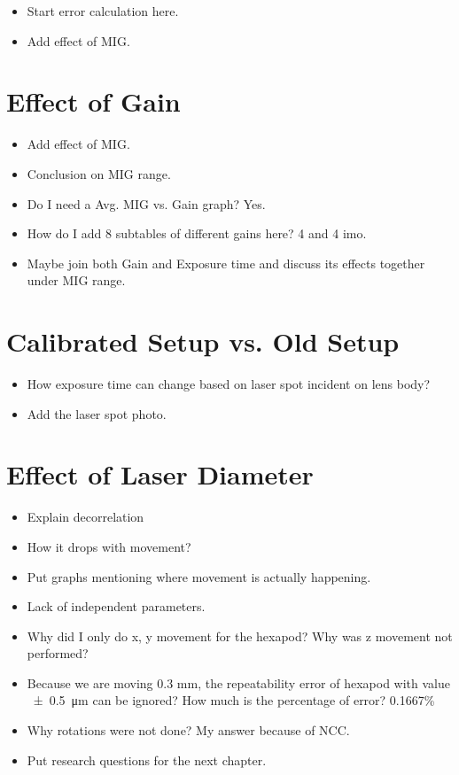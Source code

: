 \begin{itemize}
    \item Start error calculation here.
    \item Add effect of MIG.
\end{itemize}

\clearpage

\section{Effect of Gain}
\begin{itemize}
\item Add effect of MIG.
\item Conclusion on MIG range.
\item Do I need a Avg. MIG vs. Gain graph? Yes.
\item How do I add 8 subtables of different gains here? 4 and 4 imo.
\item Maybe join both Gain and Exposure time and discuss its effects together under MIG range.
\end{itemize}

\section{Calibrated Setup vs. Old Setup}
\begin{itemize}
    \item How exposure time can change based on laser spot incident on lens body?
    \item Add the laser spot photo.
\end{itemize}

\section{Effect of Laser Diameter}
\begin{itemize}
    \item Explain decorrelation
    \item How it drops with movement?
    \item Put graphs mentioning where movement is actually happening.
\end{itemize}

\begin{itemize}
    \item Lack of independent parameters.
    \item Why did I only do x, y movement for the hexapod? Why was z movement not performed?
    \item Because we are moving 0.3 mm, the repeatability error of hexapod with value \SI{\pm0.5}{\micro\meter} can be ignored? How much is the percentage of error? 0.1667\%
    \item Why rotations were not done? My answer because of NCC.
    \item Put research questions for the next chapter.
\end{itemize}